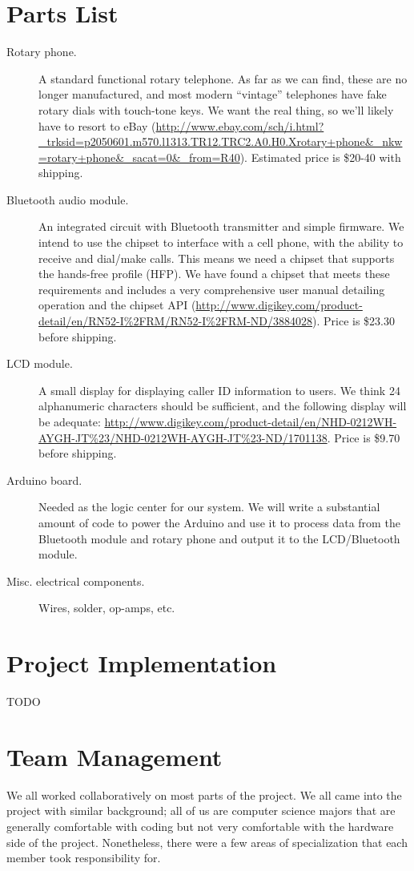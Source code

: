 \documentclass{es50report}
\begin{document}
    \section{Parts List}
        \begin{description}
            \item[Rotary phone.] A standard functional rotary telephone. As far as we can find, these are no longer manufactured, and most modern ``vintage'' telephones have fake rotary dials with touch-tone keys. We want the real thing, so we'll likely have to resort to eBay (\url{http://www.ebay.com/sch/i.html?_trksid=p2050601.m570.l1313.TR12.TRC2.A0.H0.Xrotary+phone&_nkw=rotary+phone&_sacat=0&_from=R40}). Estimated price is \$20-40 with shipping.
            \item[Bluetooth audio module.] An integrated circuit with Bluetooth transmitter and simple firmware. We intend to use the chipset to interface with a cell phone, with the ability to receive and dial/make calls. This means we need a chipset that supports the hands-free profile (HFP). We have found a chipset that meets these requirements and includes a very comprehensive user manual detailing operation and the chipset API (\url{http://www.digikey.com/product-detail/en/RN52-I%2FRM/RN52-I%2FRM-ND/3884028}). Price is \$23.30 before shipping.
            \item[LCD module.] A small display for displaying caller ID information to users. We think 24 alphanumeric characters should be sufficient, and the following display will be adequate: \url{http://www.digikey.com/product-detail/en/NHD-0212WH-AYGH-JT%23/NHD-0212WH-AYGH-JT%23-ND/1701138}. Price is \$9.70 before shipping.
            \item[Arduino board.] Needed as the logic center for our system. We will write a substantial amount of code to power the Arduino and use it to process data from the Bluetooth module and rotary phone and output it to the LCD/Bluetooth module.
            \item[Misc. electrical components.] Wires, solder, op-amps, etc.
        \end{description}

    \section{Project Implementation}
    TODO

    \section{Team Management}
        We all worked collaboratively on most parts of the project. We all came into the project with similar background; all of us are computer science majors that are generally comfortable with coding but not very comfortable with the hardware side of the project. Nonetheless, there were a few areas of specialization that each member took responsibility for.
\end{document}
